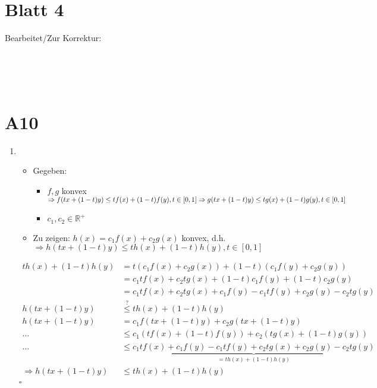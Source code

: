 \documentclass[fleqn,12pt]{scrartcl}
\newcommand{\blattn}{Blatt 4}
\begin{document}
\section*{\blattn}
Bearbeitet/Zur Korrektur:

\noindent
\begin{Form}
	\\
	\\
	\\
\end{Form}

\section{A10}


\begin{enumerate}
	\item
		\begin{itemize}
			\item
				Gegeben: 
				\begin{itemize}
					\item
						$f,g$ konvex \\$\Rightarrow f(tx + (1-t)y) \leq tf(x) + (1-t)f(y), t\in[0,1]\\
						\Rightarrow g(tx + (1-t)y) \leq tg(x) + (1-t)g(y), t\in[0,1]$
					\item
						$c_1,c_2 \in \mathbb{R}^+$
				\end{itemize}
			\item
				Zu zeigen:
				$h(x) = c_1f(x) + c_2g(x)$ konvex, d.h.\\
				$\Rightarrow h(tx + (1-t)y) \leq th(x) + (1-t)h(y), t\in[0,1]$
		\end{itemize}
		\begin{align*}
			th(x) + (1-t)h(y) &= t(c_1 f(x) + c_2 g(x)) + (1-t)(c_1 f(y) + c_2 g(y))\\
																				 &= c_1 t f(x) + c_2 t g(x) + (1-t)c_1f(y) + (1-t) c_2 g(y) \\
																				 &= c_1 t f(x) + c_2 t g(x) + c_1 f(y) - c_1tf(y) + c_2 g(y) - c_2t g(y)\\
			h(tx + (1-t)y) &\overset?\leq th(x) + (1-t)h(y)\\
			h(tx + (1-t)y) &= c_1f(tx+(1-t)y) + c_2g(tx+(1-t)y)\\
			\dots															 &\leq c_1(tf(x) + (1-t)f(y)) + c_2(tg(x) + (1-t)g(y))\\
			\dots &\leq \underbrace{c_1tf(x) + c_1f(y) -c_1tf(y) + c_2tg(x) + c_2g(y)-c_2tg(y)}_{=th(x) + (1-t)h(y)}\\
			\Rightarrow h(tx + (1-t)y) &\leq th(x) + (1-t)h(y)\\
		\end{align*}
		\hfill $\square$


\end{enumerate}
\end{document}
